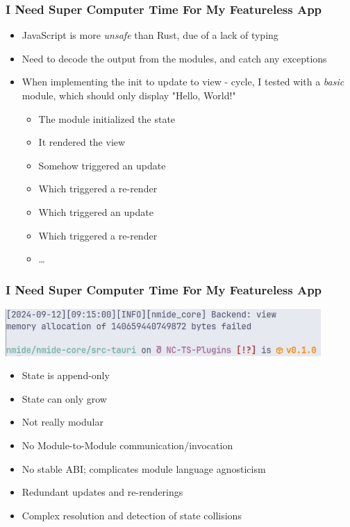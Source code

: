 \begin{frame}
  \frametitle{I Need Super Computer Time For My Featureless App}
  \begin{itemize}
      \pause
    \item JavaScript is more \textit{unsafe} than Rust, due of a lack of typing
      \pause
    \item Need to decode the output from the modules, and catch any exceptions
      \pause
    \item When implementing the init to update to view - cycle, I tested with
      a \textit{basic} module, which should only display "Hello, World!"
      \begin{itemize}
          \pause
        \item The module initialized the state
          \pause
        \item It rendered the view
          \pause
        \item Somehow triggered an update
          \pause
        \item Which triggered a re-render
          \pause
        \item Which triggered an update
          \pause
        \item Which triggered a re-render
          \pause
        \item \dots
      \end{itemize}
  \end{itemize}
\end{frame}

\begin{frame}
  \frametitle{I Need Super Computer Time For My Featureless App}
  \includegraphics[width=0.9\textwidth]{./pics/memory-allocation-zoomed.png}
\end{frame}

\begin{frame}
  \begin{itemize}
    \item State is append-only
      \pause
    \item State can only grow
      \pause
    \item Not really modular
      \pause
    \item No Module-to-Module communication/invocation
    \item No stable ABI; complicates module language agnosticism
    \item Redundant updates and re-renderings
    \item Complex resolution and detection of state collisions
  \end{itemize}
\end{frame}


